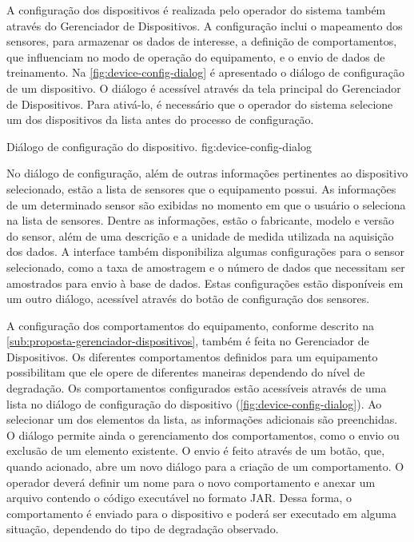 A configuração dos dispositivos é realizada pelo operador do sistema também através do Gerenciador
de Dispositivos. A configuração inclui o mapeamento dos sensores, para armazenar os dados de
interesse, a definição de comportamentos, que influenciam no modo de operação do equipamento, e o
envio de dados de treinamento. Na \cref{fig:device-config-dialog} é apresentado o diálogo de
configuração de um dispositivo. O diálogo é acessível através da tela principal do Gerenciador de
Dispositivos. Para ativá-lo, é necessário que o operador do sistema selecione um dos dispositivos da
lista antes do processo de configuração.

  {Diálogo de configuração do dispositivo.}
  {fig:device-config-dialog}

No diálogo de configuração, além de outras informações pertinentes ao dispositivo selecionado, estão
a lista de sensores que o equipamento possui. As informações de um determinado sensor são exibidas
no momento em que o usuário o seleciona na lista de sensores. Dentre as informações, estão o
fabricante, modelo e versão do sensor, além de uma descrição e a unidade de medida utilizada na
aquisição dos dados. A interface também disponibiliza algumas configurações para o sensor
selecionado, como a taxa de amostragem e o número de dados que necessitam ser amostrados para envio
à base de dados. Estas configurações estão disponíveis em um outro diálogo, acessível através do
botão de configuração dos sensores.

A configuração dos comportamentos do equipamento, conforme descrito na
\cref{sub:proposta-gerenciador-dispositivos}, também é feita no Gerenciador de Dispositivos. Os
diferentes comportamentos definidos para um equipamento possibilitam que ele opere de diferentes
maneiras dependendo do nível de degradação. Os comportamentos configurados estão acessíveis através
de uma lista no diálogo de configuração do dispositivo (\cref{fig:device-config-dialog}). Ao
selecionar um dos elementos da lista, as informações adicionais são preenchidas. O diálogo permite
ainda o gerenciamento dos comportamentos, como o envio ou exclusão de um elemento existente. O envio
é feito através de um botão, que, quando acionado, abre um novo diálogo para a criação de um
comportamento. O operador deverá definir um nome para o novo comportamento e anexar um arquivo
contendo o código executável no formato \gls{JAR}. Dessa forma, o comportamento é enviado para o
dispositivo e poderá ser executado em alguma situação, dependendo do tipo de degradação observado.

